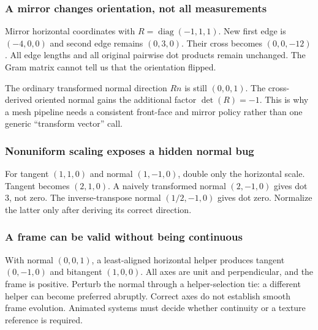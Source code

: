 \subsubsection{A mirror changes orientation, not all measurements}\label{appendix-92ff77d4dfdc-a-mirror-changes-orientation-not-all-measurements}

\hypertarget{appendix-92ff77d4dfdc-a-mirror-changes-orientation-not-all-measurements}{}

Mirror horizontal coordinates with \(R=\operatorname{diag}(-1,1,1)\). New first edge is \((-4,0,0)\) and second edge remains \((0,3,0)\). Their cross becomes \((0,0,-12)\). All edge lengths and all original pairwise dot products remain unchanged. The Gram matrix cannot tell us that the orientation flipped.

The ordinary transformed normal direction \(Rn\) is still \((0,0,1)\). The cross-derived oriented normal gains the additional factor \(\det(R)=-1\). This is why a mesh pipeline needs a consistent front-face and mirror policy rather than one generic ``transform vector'' call.

\subsubsection{Nonuniform scaling exposes a hidden normal bug}\label{appendix-92ff77d4dfdc-nonuniform-scaling-exposes-a-hidden-normal-bug}

\hypertarget{appendix-92ff77d4dfdc-nonuniform-scaling-exposes-a-hidden-normal-bug}{}

For tangent \((1,1,0)\) and normal \((1,-1,0)\), double only the horizontal scale. Tangent becomes \((2,1,0)\). A naively transformed normal \((2,-1,0)\) gives dot \(3\), not zero. The inverse-transpose normal \((1/2,-1,0)\) gives dot zero. Normalize the latter only after deriving its correct direction.

\subsubsection{A frame can be valid without being continuous}\label{appendix-92ff77d4dfdc-a-frame-can-be-valid-without-being-continuous}

\hypertarget{appendix-92ff77d4dfdc-a-frame-can-be-valid-without-being-continuous}{}

With normal \((0,0,1)\), a least-aligned horizontal helper produces tangent \((0,-1,0)\) and bitangent \((1,0,0)\). All axes are unit and perpendicular, and the frame is positive. Perturb the normal through a helper-selection tie: a different helper can become preferred abruptly. Correct axes do not establish smooth frame evolution. Animated systems must decide whether continuity or a texture reference is required.

